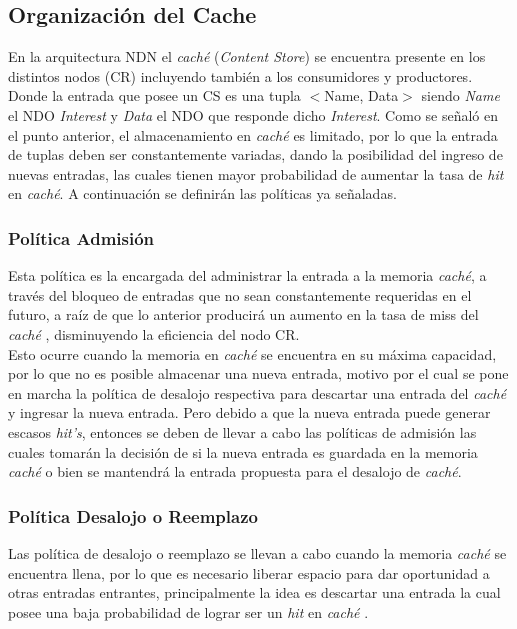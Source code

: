 \documentclass[12pt]{ociamthesis}  %
\begin{document}
\subsection{Organización del Cache}

En la arquitectura NDN el \textit{caché} (\textit{Content Store}) se encuentra presente en los distintos nodos (CR) incluyendo también a los consumidores y productores. Donde la entrada que posee un CS es una tupla $<$Name, Data$>$ siendo \textit{Name} el NDO \textit{Interest} y \textit{Data} el NDO que responde dicho \textit{Interest}. Como se señaló en el punto anterior, el almacenamiento en \textit{caché} es limitado, por lo que la entrada de tuplas deben ser constantemente variadas, dando la posibilidad del ingreso de nuevas entradas, las cuales tienen mayor probabilidad de aumentar la tasa de \textit{hit} en \textit{caché}. A continuación se definirán las políticas ya señaladas. 

\subsubsection{Política Admisión}
Esta política es la encargada del administrar la entrada a la memoria \textit{caché}, a través del bloqueo de entradas que no sean constantemente requeridas en el futuro, a raíz de que lo anterior producirá un aumento en la tasa de miss del \textit{caché} \cite{baeza2007admission}, disminuyendo la eficiencia del nodo CR.\\

Esto ocurre cuando la memoria en \textit{caché} se encuentra en su máxima capacidad, por lo que no es posible almacenar una nueva entrada, motivo por el cual se pone en marcha la política de desalojo respectiva para descartar una entrada del \textit{caché} y ingresar la nueva entrada. Pero debido a que la nueva entrada puede generar escasos \textit{hit's}, entonces se deben de llevar a cabo las políticas de admisión las cuales tomarán la decisión de si la nueva entrada es guardada en la memoria \textit{caché} o bien se mantendrá la entrada propuesta para el desalojo de \textit{caché}.\\

\subsubsection{Política Desalojo o Reemplazo}
Las política de desalojo o reemplazo se llevan a cabo cuando la memoria \textit{caché} se encuentra llena, por lo que es necesario liberar espacio para dar oportunidad a otras entradas entrantes, principalmente la idea es descartar una entrada la cual posee una baja probabilidad de lograr ser un \textit{hit} en \textit{caché} \cite{baeza2007admission}.\\
\end{document}
